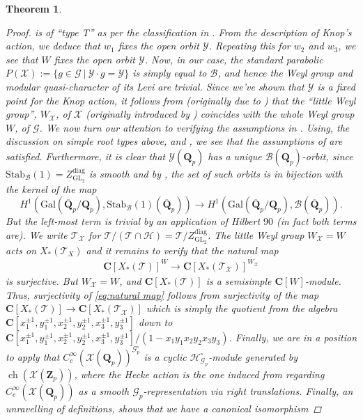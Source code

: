 \documentclass{amsart}%
\theoremstyle{plain}
\newtheorem{thm}{Theorem}[subsection]
\theoremstyle{plain}
\theoremstyle{remark}
\DeclareMathOperator{\GL}{GL}
\DeclareMathOperator{\ch}{ch}
\begin{document}
\begin{thm}
\begin{proof}
        is of ``type T'' as per the classification in \cite[\S $2.1.1$]{Sakellaridis_2008}. From the description of Knop's action, we deduce that $w_1$ fixes the open orbit $\mathcal{Y}$. Repeating this for $w_2$ and $w_3$, we see that $W$ fixes the open orbit $\mathcal{Y}$. Now, in our case, the standard parabolic $P(\mathcal{X}):=\{g\in \mathscr{G}\ |\ \mathcal{Y}\cdot g=\mathcal{Y}\}$ is simply equal to $\mathscr{B}$, and hence the Weyl group and modular quasi-character of its Levi are trivial. Since we've shown that $\mathcal{Y}$ is a fixed point for the Knop action, it follows from \cite[Theorem $2.2.2$]{Sakellaridis_2008} (originally due to \cite{knop1995set}) that the ``little Weyl group'', $W_\mathcal{X}$, of $\mathcal{X}$ (originally introduced by \cite{brion1990vers}) coincides with the whole Weyl group $W$, of $\mathscr{G}$. We now turn our attention to verifying the assumptions in \cite[\S $8$]{sakellaridis2013spherical}. Using, the discussion on simple root types above, and \cite[\S $7$]{sakellaridis2013spherical}, we see that the assumptions of \cite[Theorem $7.2.1$]{sakellaridis2013spherical} are satisfied. Furthermore, it is clear that $\mathcal{Y}(\mathbf{Q}_p)$ has a unique $\mathscr{B}(\mathbf{Q}_p)$-orbit, since $\mathrm{Stab}_{\mathscr{B}}(1)=Z_{\GL_2}^\mathrm{diag}$ is smooth and by \cite[Proposition $1$]{bhargava2014arithmetic}, the set of such orbits is in bijection with the kernel of the map$$H^1\left(\mathrm{Gal}(\overline{\mathbf{Q}}_p/\mathbf{Q}_p),\mathrm{Stab}_\mathscr{B}(1)(\overline{\mathbf{Q}}_p)\right)\longrightarrow H^1\left(\mathrm{Gal}(\overline{\mathbf{Q}}_p/\mathbf{Q}_p),\mathscr{B}(\overline{\mathbf{Q}}_p)\right).$$But the left-most term is trivial by an application of Hilbert $90$ (in fact both terms are). We write $\mathscr{T}_\mathcal{X}$ for $\mathscr{T}/(\mathscr{T}\cap \mathscr{H})=\mathscr{T}/Z_{\GL_2}^{\mathrm{diag}}$. The little Weyl group $W_\mathcal{X}=W$ acts on $X_*(\mathscr{T}_X)$ and it remains to verify that the natural map
        \begin{align}\label{eq:natural map}\mathbf{C}[X_*(\mathscr{T})]^W\longrightarrow \mathbf{C}[X_*(\mathscr{T}_\mathcal{X})]^{W_\mathcal{X}}\end{align}
        is surjective. But $W_\mathcal{{X}}=W$, and $\mathbf{C}[X_*(\mathscr{T})]$ is a semisimple $\mathbf{C}[W]$-module. Thus, surjectivity of \eqref{eq:natural map} follows from surjectivity of the map $\mathbf{C}[X_*(\mathscr{T})]\rightarrow \mathbf{C}[X_*(\mathscr{T}_\mathcal{X})]$ which is simply the quotient from the algebra $\mathbf{C}[x_1^{\pm1},y_1^{\pm1},x_2^{\pm1},y_2^{\pm1},x_3^{\pm1},y_3^{\pm1}]$ down to $\mathbf{C}[x_1^{\pm1},y_1^{\pm1},x_2^{\pm1},y_2^{\pm1},x_3^{\pm1},y_3^{\pm1}]/(1-x_1y_1x_2y_2x_3y_3)$. Finally, we are in a position to apply \cite[Corollary $8.0.4$]{sakellaridis2013spherical} that $C_c^\infty(\mathcal{X}(\mathbf{Q}_p))^{\mathscr{G}_p^\circ}$ is a cyclic $\mathcal{H}_{\mathscr{G}_p}^\circ$-module generated by $\ch(\mathcal{X}(\mathbf{Z}_p))$, where the Hecke action is the one induced from regarding $C_c^\infty(\mathcal{X}(\mathbf{Q}_p))$ as a smooth $\mathscr{G}_p$-representation via right translations. Finally, an unravelling of definitions, shows that we have a canonical isomorphism

\end{proof}
\end{thm}
\end{document}
